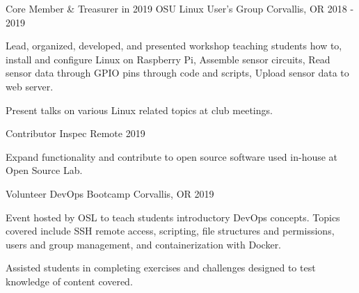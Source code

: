 

\begin{cventries}

  \cventry
    {Core Member \& Treasurer in 2019} %
    {OSU Linux User’s Group} %
    {Corvallis, OR} %
    {2018 - 2019} %
    {
      \begin{cvitems} %
         \item{Lead, organized, developed, and presented workshop teaching students how to, install and configure Linux on Raspberry Pi, Assemble sensor circuits, Read sensor data through GPIO pins through code and scripts, Upload sensor data to web server.}
         \item{Present talks on various Linux related topics at club meetings.}
      \end{cvitems}
    }

  \cventry
    {Contributor} %
    {Inspec} %
    {Remote} %
    {2019} %
    {
      \begin{cvitems} %
         \item{Expand functionality and contribute to open source software used in-house at Open Source Lab.}
      \end{cvitems}
    }

  \cventry
    {Volunteer} %
    {DevOps Bootcamp} %
    {Corvallis, OR} %
    {2019} %
    {
      \begin{cvitems} %
         \item{Event hosted by OSL to teach students introductory DevOps concepts. Topics covered include SSH remote access, scripting, file structures and permissions, users and group management, and containerization with Docker.}
         \item{Assisted students in completing exercises and challenges designed to test knowledge of content covered.}
      \end{cvitems}
    }

\end{cventries}
